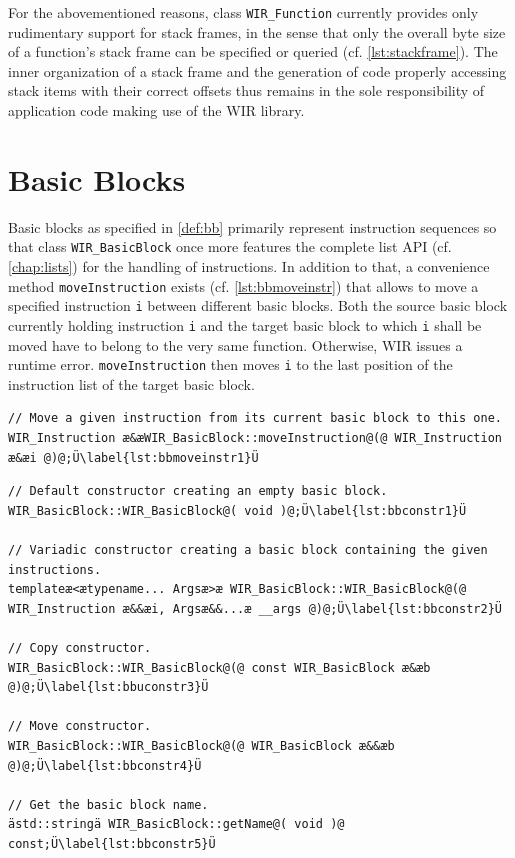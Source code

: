 For the abovementioned reasons, class \texttt{WIR\_Function} currently provides only rudimentary support for stack frames, in the sense that only the overall byte size of a function's stack frame can be specified or queried (cf. \cref{lst:stackframe}).
The inner organization of a stack frame and the generation of code properly accessing stack items with their correct offsets thus remains in the sole responsibility of application code making use of the \gls{WIR} library.


\section{Basic Blocks}
\label{sec:basicblocks}

Basic blocks as specified in \cref{def:bb} primarily represent instruction sequences so that class \texttt{WIR\_Basic\-Block} once more features the complete list \gls{API} (cf. \cref{chap:lists}) for the handling of instructions.
In addition to that, a convenience method \texttt{moveInstruction} exists (cf. \cref{lst:bbmoveinstr}) that allows to move a specified instruction \texttt{i} between different basic blocks.
Both the source basic block currently holding instruction \texttt{i} and the target basic block to which \texttt{i} shall be moved have to belong to the very same function.
Otherwise, \gls{WIR} issues a runtime error.
\texttt{moveInstruction} then moves \texttt{i} to the last position of the instruction list of the target basic block.

\begin{lstlisting}[style=code,float=t,caption={Moving of Instructions by Class \texttt{WIR\_BasicBlock}},label=lst:bbmoveinstr]
// Move a given instruction from its current basic block to this one.
WIR_Instruction æ&æWIR_BasicBlock::moveInstruction@(@ WIR_Instruction æ&æi @)@;Ü\label{lst:bbmoveinstr1}Ü
\end{lstlisting}

\begin{lstlisting}[style=code,float=h,caption={Constructors and Methods for Name Handling of Class \texttt{WIR\_BasicBlock}},label=lst:bbconstruction]
// Default constructor creating an empty basic block.
WIR_BasicBlock::WIR_BasicBlock@( void )@;Ü\label{lst:bbconstr1}Ü

// Variadic constructor creating a basic block containing the given instructions.
templateæ<ætypename... Argsæ>æ WIR_BasicBlock::WIR_BasicBlock@(@ WIR_Instruction æ&&æi, Argsæ&&...æ __args @)@;Ü\label{lst:bbconstr2}Ü

// Copy constructor.
WIR_BasicBlock::WIR_BasicBlock@(@ const WIR_BasicBlock æ&æb @)@;Ü\label{lst:bbuconstr3}Ü

// Move constructor.
WIR_BasicBlock::WIR_BasicBlock@(@ WIR_BasicBlock æ&&æb @)@;Ü\label{lst:bbconstr4}Ü

// Get the basic block name.
ästd::stringä WIR_BasicBlock::getName@( void )@ const;Ü\label{lst:bbconstr5}Ü
\end{lstlisting}

